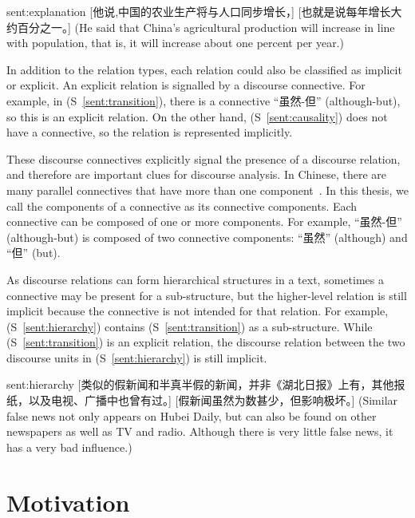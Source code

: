 \begin{sent}{sent:explanation}{}
    [他说,中国的农业生产将与人口同步增长，] [也就是说每年增长大约百分之一。]
    (He said that China's agricultural production will increase in line with
    population, that is, it will increase about one percent per year.)
\end{sent}

In addition to the relation types, each relation could also be classified
as implicit or explicit. An explicit relation is signalled by a discourse connective.
For example, in (S~\ref{sent:transition}), there is a connective ``虽然-但''
(although-but), so this is an explicit relation. On the other hand,
(S~\ref{sent:causality}) does not have a connective, so the relation
is represented implicitly.

These discourse connectives explicitly signal the presence of a discourse relation,
and therefore are important clues for discourse analysis.
In Chinese, there are many parallel connectives that have more than one
component~\citep{zhou2012pdtb}.
In this thesis, we call the components of a connective as its connective components.
Each connective can be composed of one or more components. For example, ``虽然-但''
(although-but) is composed of two connective components: ``虽然'' (although)
and ``但'' (but).

As discourse relations can form hierarchical structures in a text, sometimes
a connective may be present for a sub-structure, but the higher-level relation
is still implicit because the connective is not intended for that relation.
For example, (S~\ref{sent:hierarchy}) contains (S~\ref{sent:transition})
as a sub-structure. While (S~\ref{sent:transition}) is an explicit relation,
the discourse relation between the two discourse units in (S~\ref{sent:hierarchy})
is still implicit.

\begin{sent}{sent:hierarchy}{}
    [类似的假新闻和半真半假的新闻，并非《湖北日报》上有，其他报纸，以及电视、广播中也曾有过。]
    [假新闻虽然为数甚少，但影响极坏。]
    (Similar false news not only appears on Hubei Daily, but can also be found on
    other newspapers as well as TV and radio.
    Although there is very little false news, it has a very bad influence.)
\end{sent}



%
%
\section{Motivation}

